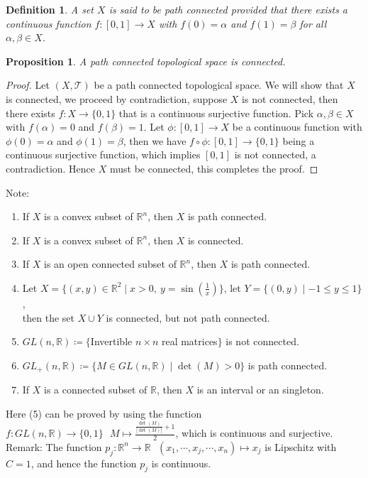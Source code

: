 \documentclass[11pt,oneside]{book}
\theoremstyle{break}
\theoremstyle{break}
\newtheorem{prop}[lem]{Proposition}
\newtheorem{defn}{Definition}[corL]
\newcommand{\R}{\mathbb{R}}
\newcommand{\T}{\mathcal{T}}
\newcommand{\note}{\color{red}Note: \color{black}}
\newcommand{\remark}{\color{blue}Remark: \color{black}}
\begin{document}
\begin{defn}
A set $X$ is said to be path connected provided that there exists a continuous function $f:[0,1] \to X$ with $f(0) = \alpha$ and $f(1) = \beta$ for all $\alpha,\beta \in X$.
\end{defn}

\begin{prop}
A path connected topological space is connected.
\end{prop}
\begin{proof}
Let $(X,\T)$ be a path connected topological space. We will show that $X$ is connected, we proceed by contradiction, suppose $X$ is not connected, then there exists $f:X \to \{0,1\}$ that is a continuous surjective function. Pick $\alpha,\beta \in X$ with $f(\alpha) = 0$ and $f(\beta) = 1$. Let $\phi:[0,1] \to X$ be a continuous function with $\phi(0) = \alpha$ and $\phi(1) = \beta$, then we have $f\circ \phi :[0,1] \to \{0,1\}$ being a continuous surjective function, which implies $[0,1]$ is not connected, a contradiction. Hence $X$ must be connected, this completes the proof.
\end{proof}

\note \begin{enumerate}[topsep=3pt,itemsep=-1ex,partopsep=1ex,parsep=1ex]
\item If $X$ is a convex subset of $\R^n$, then $X$ is path connected.
\item If $X$ is a convex subset of $\R^n$, then $X$ is connected.
\item If $X$ is an open connected subset of $\R^n$, then $X$ is path connected.
\item Let $X=\{(x,y) \in \R^2 \mid x>0,\ y=\sin(\frac{1}{x})\}$, let $Y=\{(0,y)\mid -1\leq y \leq 1\}$,\\ then the set $X\cup Y$ is connected, but not path connected.
\item $GL(n,\R)\coloneqq \{$Invertible $n\times n$ real matrices$\}$ is not connected.
\item $GL_{+}(n,\R)\coloneqq \{ M \in GL(n,\R) \mid \det(M)>0\}$ is path connected.
\item If $X$ is a connected subset of $\R$, then $X$ is an interval or an singleton.
\end{enumerate}
Here (5) can be proved by using the function $f: GL(n,\R) \to \{0,1\} \ \ \ M \mapsto \frac{\frac{\det(M)}{|\det(M)|}+1}{2}$, which is continuous and surjective.\\

\remark The function $p_j : \R^n \to \R \ \ \ (x_1,\cdots,x_j,\cdots, x_n)\mapsto x_j$ is Lipschitz with $C=1$, and hence the function $p_j$ is continuous. \\
\end{document}
